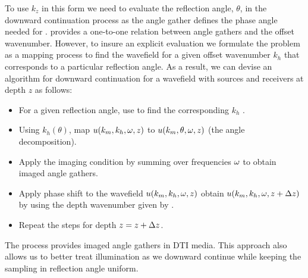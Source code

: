 To use $k_z$ in this form we need to evaluate the reflection angle,
$\theta$, in the downward continuation process as the angle gather defines the phase angle needed for .
  provides a one-to-one relation between
angle gathers and the offset wavenumber. However, to insure an
explicit evaluation we formulate the problem as a mapping process to
find the wavefield for a given offset wavenumber $k_h$ that
corresponds to a particular reflection angle. As a result, we can
devise an algorithm for downward continuation for a wavefield with
sources and receivers at depth $z$ as follows:
\begin{itemize}
\item For a given reflection angle, use  to find the
  corresponding $k_h$ \geouline{($=\klx$)}.
\item Using $k_h(\theta)$, map ${u}(k_m,k_h,\omega,z)$ to ${u}(k_m,
  \theta,\omega,z)$ (the angle decomposition).
\item Apply the imaging condition by summing over frequencies $\omega$ to
  obtain imaged angle gathers.
\item Apply phase shift to the wavefield ${u}(k_m,k_h,\omega, z)$ 
  obtain ${u}(k_m,k_h,\omega, z+\Delta z)$ by  using the depth
  wavenumber given by .
\item {} Repeat the steps for depth $z=z+\Delta z$.
\end{itemize}
The process provides imaged angle gathers in DTI media.  This approach
also allows us to better treat illumination as we downward
continue while keeping the sampling in reflection angle uniform.



